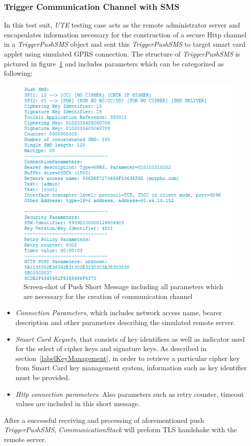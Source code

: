 \subsubsection{Trigger Communication Channel with SMS} \label{secAppletTest1}
In this test suit, \emph{UTE} testing case acts as the remote administrator server and encapsulates information necessary for the construction of a secure Http channel in a \emph{TriggerPushSMS} object and sent this \emph{TriggerPushSMS} to target smart card applet using simulated GPRS connection. The structure of \emph{TriggerPushSMS}  is pictured in figure~\ref{fig:push-sms} and includes parameters which can be categorized as following:
\begin{figure}[!htb]
	\centering
	\includegraphics[width=1.0\textwidth]{Images/impl/push-sms.png}
		\caption{Screen-shot of Push Short Message including all parameters which are necessary for the creation of communication channel}
	\label{fig:push-sms}
\end{figure}
\begin{itemize}
\item \emph{Connection Parameters}, which includes network access name, bearer description and other parameters describing the simulated remote server.
\item \emph{Smart Card Keysets}, that consists of key identifiers as well as indicator used for the select of cipher keys and signature keys. As described in section~\ref{labelKeyManagement}, in order to retrieve a particular cipher key from Smart Card  key management system, information such as key identifier must be provided.
\item \emph{Http connection parameters}. Also parameters such as retry counter, timeout values are included in this short message.
\end{itemize}
After a successful receiving and processing of aforementioned push \emph{TriggerPushSMS}, \emph{CommunicationStack} will preform TLS handshake with the remote server. 

